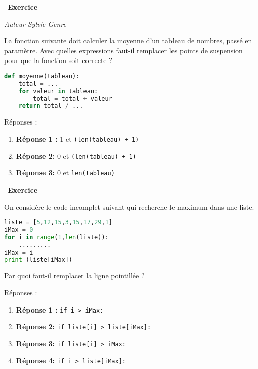 \documentclass[
  11pt,
]{article}
\newcommand{\passthrough}[1]{#1}
\providecommand{\tightlist}{%
  \setlength{\itemsep}{0pt}\setlength{\parskip}{0pt}}
\newcounter{exo}
\newenvironment{exercice}[1]
{\par \medskip   \addtocounter{exo}{1} \noindent  
\begin{bclogo}[arrondi =0.1,   noborder = true, logo=\bccrayon, marge=4]{~\textbf{Exercice} \textbf{\theexo} {\itshape #1} }  \par}
{
\end{bclogo}
 \par \bigskip }
\newcounter{def}
\begin{document}
\begin{exercice}{}

\emph{Auteur Sylvie Genre}

La fonction suivante doit calculer la moyenne d'un tableau de nombres,
passé en paramètre. Avec quelles expressions faut-il remplacer les
points de suspension pour que la fonction soit correcte ?

\begin{lstlisting}[language=Python]
def moyenne(tableau):
    total = ...
    for valeur in tableau:
        total = total + valeur
    return total / ...
\end{lstlisting}

Réponses :

\begin{enumerate}
\def\labelenumi{\arabic{enumi}.}
\tightlist
\item
  \textbf{Réponse 1 :} 1 et \passthrough{\lstinline!(len(tableau) + 1)!}
\item
  \textbf{Réponse 2:} 0 et \passthrough{\lstinline!(len(tableau) + 1)!}
\item
  \textbf{Réponse 3:} 0 et \passthrough{\lstinline!len(tableau)!}
\end{enumerate}

\end{exercice}

\begin{exercice}{}

On considère le code incomplet suivant qui recherche le maximum dans une
liste.

\begin{lstlisting}[language=Python]
liste = [5,12,15,3,15,17,29,1]
iMax = 0
for i in range(1,len(liste)):
    .........
iMax = i
print (liste[iMax])
\end{lstlisting}

Par quoi faut-il remplacer la ligne pointillée ?

Réponses :

\begin{enumerate}
\def\labelenumi{\arabic{enumi}.}
\tightlist
\item
  \textbf{Réponse 1 :} \passthrough{\lstinline!if i > iMax:!}
\item
  \textbf{Réponse 2:}
  \passthrough{\lstinline!if liste[i] > liste[iMax]:!}
\item
  \textbf{Réponse 3:} \passthrough{\lstinline!if liste[i] > iMax:!}
\item
  \textbf{Réponse 4:} \passthrough{\lstinline!if i > liste[iMax]:!}
\end{enumerate}

\end{exercice}
\end{document}
